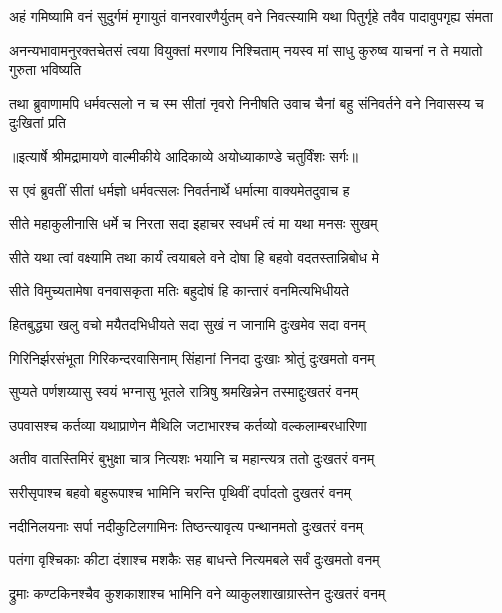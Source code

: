 \fourlineindentedshloka
{अहं गमिष्यामि वनं सुदुर्गमं}
{ मृगायुतं वानरवारणैर्युतम्}
{वने निवत्स्यामि यथा पितुर्गृहे}
{ तवैव पादावुपगृह्य संमता} %

\fourlineindentedshloka
{अनन्यभावामनुरक्तचेतसं}
{ त्वया वियुक्तां मरणाय निश्चिताम्}
{नयस्व मां साधु कुरुष्व याचनां}
{ न ते मयातो गुरुता भविष्यति} %

\fourlineindentedshloka
{तथा ब्रुवाणामपि धर्मवत्सलो}
{ न च स्म सीतां नृवरो निनीषति}
{उवाच चैनां बहु संनिवर्तने}
{ वने निवासस्य च दुःखितां प्रति} %


{॥इत्यार्षे श्रीमद्रामायणे वाल्मीकीये आदिकाव्ये अयोध्याकाण्डे चतुर्विंशः सर्गः॥}


\twolineshloka
{स एवं ब्रुवतीं सीतां धर्मज्ञो धर्मवत्सलः}
{निवर्तनार्थे धर्मात्मा वाक्यमेतदुवाच ह} %

\twolineshloka
{सीते महाकुलीनासि धर्मे च निरता सदा}
{इहाचर स्वधर्मं त्वं मा यथा मनसः सुखम्} %

\twolineshloka
{सीते यथा त्वां वक्ष्यामि तथा कार्यं त्वयाबले}
{वने दोषा हि बहवो वदतस्तान्निबोध मे} %

\twolineshloka
{सीते विमुच्यतामेषा वनवासकृता मतिः}
{बहुदोषं हि कान्तारं वनमित्यभिधीयते} %

\twolineshloka
{हितबुद्ध्या खलु वचो मयैतदभिधीयते}
{सदा सुखं न जानामि दुःखमेव सदा वनम्} %

\twolineshloka
{गिरिनिर्झरसंभूता गिरिकन्दरवासिनाम्}
{सिंहानां निनदा दुःखाः श्रोतुं दुःखमतो वनम्} %

\twolineshloka
{सुप्यते पर्णशय्यासु स्वयं भग्नासु भूतले}
{रात्रिषु श्रमखिन्नेन तस्माद्दुःखतरं वनम्} %

\twolineshloka
{उपवासश्च कर्तव्या यथाप्राणेन मैथिलि}
{जटाभारश्च कर्तव्यो वल्कलाम्बरधारिणा} %

\twolineshloka
{अतीव वातस्तिमिरं बुभुक्षा चात्र नित्यशः}
{भयानि च महान्त्यत्र ततो दुःखतरं वनम्} %

\twolineshloka
{सरीसृपाश्च बहवो बहुरूपाश्च भामिनि}
{चरन्ति पृथिवीं दर्पादतो दुखतरं वनम्} %

\twolineshloka
{नदीनिलयनाः सर्पा नदीकुटिलगामिनः}
{तिष्ठन्त्यावृत्य पन्थानमतो दुःखतरं वनम्} %

\twolineshloka
{पतंगा वृश्चिकाः कीटा दंशाश्च मशकैः सह}
{बाधन्ते नित्यमबले सर्वं दुःखमतो वनम्} %

\twolineshloka
{द्रुमाः कण्टकिनश्चैव कुशकाशाश्च भामिनि}
{वने व्याकुलशाखाग्रास्तेन दुःखतरं वनम्} %

